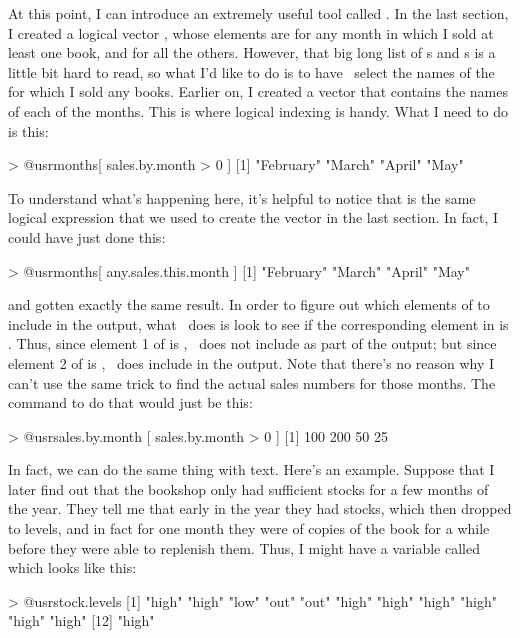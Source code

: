 At this point, I can introduce an extremely useful tool called . In the last section, I created a logical vector , whose elements are  for any month in which I sold at least one book, and  for all the others. However, that big long list of s and s is a little bit hard to read, so what I'd like to do is to have \R\ select the names of the  for which I sold any books. Earlier on, I created a vector  that contains the names of each of the months. This is where logical indexing is handy. What I need to do is this:
\begin{rblock1}
> @usr{months[ sales.by.month > 0 ]}
[1] "February" "March"    "April"    "May" 
\end{rblock1}
To understand what's happening here, it's helpful to notice that  is the same logical expression that we used to create the  vector in the last section. In fact, I could have just done this:
\begin{rblock1}
> @usr{months[ any.sales.this.month ]}
[1] "February" "March"    "April"    "May" 
\end{rblock1}
and gotten exactly the same result. In order to figure out which elements of  to include in the output, what \R\ does is look to see if the corresponding element in  is . Thus, since element 1 of  is , \R\ does not include  as part of the output; but since element 2 of  is , \R\ does include  in the output. Note that there's no reason why I can't use the same trick to find the actual sales numbers for those months. The command to do that would just be this:
\begin{rblock1}
> @usr{sales.by.month [ sales.by.month > 0 ]}
[1] 100 200  50  25
\end{rblock1}
In fact, we can do the same thing with text. Here's an example. Suppose that I later find out that the bookshop only had sufficient stocks for a few months of the year. They tell me that early in the year they had  stocks, which then dropped to  levels, and in fact for one month they were  of copies of the book for a while before they were able to replenish them. Thus, I might have a variable called  which looks like this:
\begin{rblock1}
> @usr{stock.levels}
 [1] "high" "high" "low"  "out"  "out"  "high" "high" "high" "high" "high" "high"
[12] "high"
\end{rblock1}
